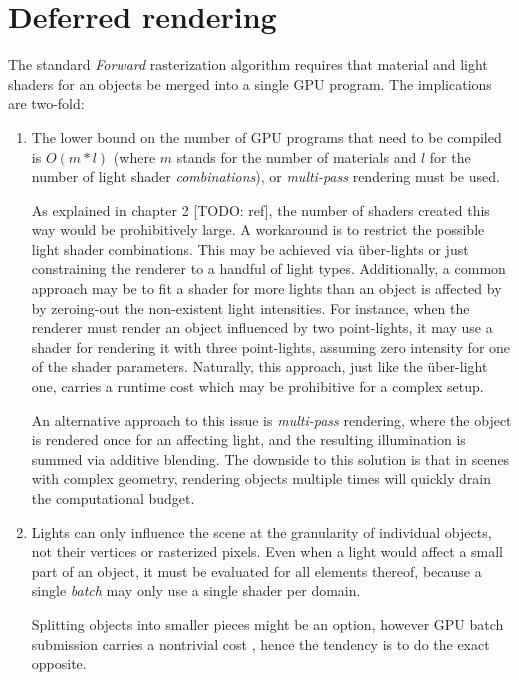 \section{Deferred rendering}

The standard \emph{Forward} rasterization algorithm requires that material and light shaders for an objects be merged into a single GPU program. The implications are two-fold:
\begin{enumerate}
\item The lower bound on the number of GPU programs that need to be compiled is $O(m * l)$ (where $m$ stands for the number of materials and $l$ for the number of light shader \emph{combinations}), or \emph{multi-pass} rendering must be used.

As explained in chapter 2 [TODO: ref], the number of shaders created this way would be prohibitively large. A workaround is to restrict the possible light shader combinations. This may be achieved via über-lights \cite{UberLights, UberLightsCg} or just constraining the renderer to a handful of light types. Additionally, a common approach may be to fit a shader for more lights than an object is affected by by zeroing-out the non-existent light intensities. For instance, when the renderer must render an object influenced by two point-lights, it may use a shader for rendering it with three point-lights, assuming zero intensity for one of the shader parameters. Naturally, this approach, just like the über-light one, carries a runtime cost which may be prohibitive for a complex setup.

An alternative approach to this issue is \emph{multi-pass} rendering, where the object is rendered once for an affecting light, and the resulting illumination is summed via additive blending. The downside to this solution is that in scenes with complex geometry, rendering objects multiple times will quickly drain the computational budget.

\item Lights can only influence the scene at the granularity of individual objects, not their vertices or rasterized pixels. Even when a light would affect a small part of an object, it must be evaluated for all elements thereof, because a single \emph{batch} may only use a single shader per domain.

Splitting objects into smaller pieces might be an option, however GPU batch submission carries a nontrivial cost \cite{BatchBatchBatch}, hence the tendency is to do the exact opposite.
\end{enumerate}

